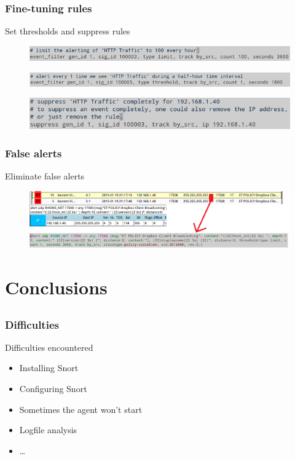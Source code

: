 \documentclass{beamer}
\begin{document}
\begin{frame}
\frametitle{Fine-tuning rules}
Set thresholds and suppress rules
\begin{figure}
   \includegraphics[width= 1\linewidth]{../images/VM_DB_8.png}
\end{figure}
\begin{figure}
   \includegraphics[width= 1\linewidth]{../images/VM_DB_9.png}
\end{figure}
\begin{figure}
   \includegraphics[width= 1\linewidth]{../images/VM_DB_10.png}
\end{figure}
\end{frame}

\begin{frame}
\frametitle{False alerts}
Eliminate false alerts
\begin{figure}
   \includegraphics[width= 1\linewidth]{../images/VM_Dropbox.png}
\end{figure}
\end{frame}



\section{Conclusions}
\subsection*{}

\begin{frame}
\frametitle{Difficulties}
\begin{block}{Difficulties encountered}
\begin{itemize}
\item Installing Snort
\item Configuring Snort
\item Sometimes the agent won't start
\item Logfile analysis
\item \ldots
\end{itemize}
\end{block}
\end{frame}
\end{document}
